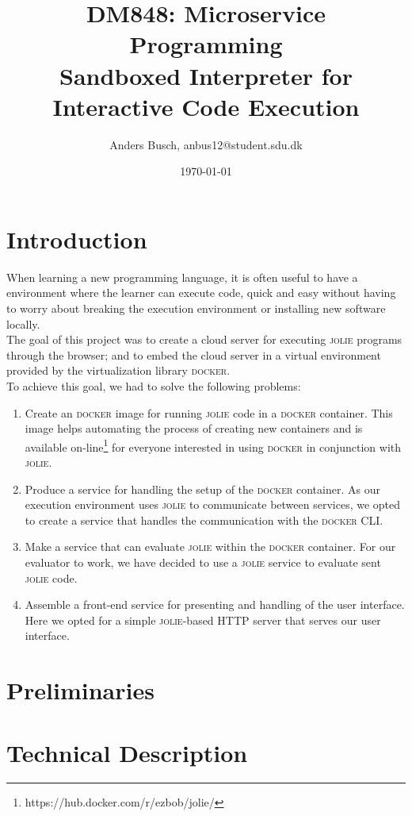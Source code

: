\documentclass[12pt]{article}
\title{ \textbf{DM848}: Microservice Programming \\ {\Large Sandboxed Interpreter for Interactive Code Execution} }
\author{Anders Busch, anbus12@student.sdu.dk}
\date{\today \\ \hrulefill{}}
\newcommand{\docker}[0] {\textsc{docker}}
\newcommand{\jolie}[0] {\textsc{jolie}}
\begin{document}
\maketitle
\tableofcontents
\newpage

\section{Introduction}

When learning a new programming language, it is often useful to have a environment where the learner can execute code, quick and easy without having to worry about breaking the execution environment or installing new software locally. \\

\noindent{}The goal of this project was to create a cloud server for executing \jolie{} programs through the browser; and to embed the cloud server in a virtual environment provided by the virtualization library \docker{}.\\

\noindent{}To achieve this goal, we had to solve the following problems:
\begin{enumerate}
	\item Create an \docker{} image for running \jolie{} code in a \docker{} container. This image helps automating the process of creating new containers and is available on-line\footnote{https://hub.docker.com/r/ezbob/jolie/} for everyone interested in using \docker{} in conjunction with \jolie{}.
	\item Produce a service for handling the setup of the \docker{} container. As our execution environment uses \jolie{} to communicate between services, we opted to create a service that handles the communication with the \docker{} CLI.
	\item Make a service that can evaluate \jolie{} within the \docker{} container. For our evaluator to work, we have decided to use a \jolie{} service to evaluate sent \jolie{} code.
	\item Assemble a front-end service for presenting and handling of the user interface. Here we opted for a simple \jolie{}-based HTTP server that serves our user interface. 
\end{enumerate}


\section{Preliminaries}

\section{Technical Description}
\end{document}
